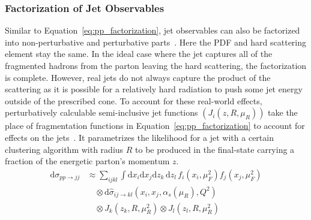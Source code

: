 \subsubsection{Factorization of Jet Observables}
Similar to Equation~\ref{eq:pp_factorization}, jet observables can also be factorized into non-perturbative and perturbative parts~\cite{factorthrm}.
Here the PDF and hard scattering element stay the same.
In the ideal case where the jet captures all of the fragmented hadrons from the parton leaving the hard scattering, the factorization is complete.
However, real jets do not always capture the product of the scattering as it is possible for a relatively hard radiation to push some jet energy outside of the prescribed cone.
To account for these real-world effects, perturbatively calculable semi-inclusive jet functions $\left(J_i \left(z,R,\mu_R\right)\right)$ take the place of fragmentation functions in Equation~\ref{eq:pp_factorization} to account for effects on the jets~\cite{Jet:FF}.
It parametrizes the likelihood for a jet with a certain clustering algorithm with radius $R$ to be produced in the final-state carrying a fraction of the energetic parton's momentum $z$.
\begin{equation}
    \label{eq:jet_factorization}
    \begin{aligned}
        \mathrm{d}\sigma_{pp\rightarrow jj}
        &\approx \sum_{ijkl}\int\mathrm{d}x_i\mathrm{d}x_j\mathrm{d}z_k\,\mathrm{d}z_l\,
        f_i\left(x_i,\mu_F^2\right)f_j\left(x_j,\mu_F^2\right) \\
        &\quad\otimes \mathrm{d}\hat{\sigma}_{ij\rightarrow kl}\left(x_i,x_j, \alpha_s \left(\mu_R\right),Q^2 \right) \\
        &\quad\otimes J_{k}\left(z_{k},R,\mu_R^2\right) \otimes J_{l}\left(z_{l},R,\mu_R^2\right)
    \end{aligned}
\end{equation}
